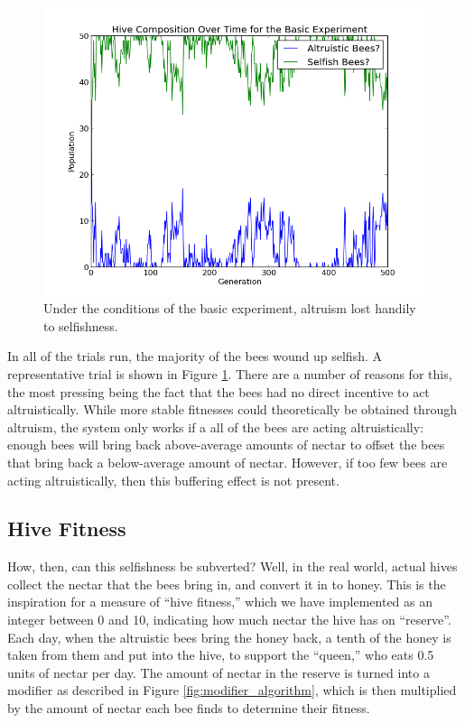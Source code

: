 \documentclass[11pt]{article}
\begin{document}
			\begin{figure}[tbpH!]
				\begin{center}
					\includegraphics[scale=.5]{results/basic_comp.png}
				\end{center}
				\caption{Under the conditions of the basic experiment, altruism lost handily to selfishness.}
				\label{fig:basic_experiment_composition}
			\end{figure}

			In all of the trials run, the majority of the bees wound up selfish. A representative trial is shown in Figure \ref{fig:basic_experiment_composition}. There are a number of reasons for this, the most pressing being the fact that the bees had no direct incentive to act altruistically. While more stable fitnesses could theoretically be obtained through altruism, the system only works if a all of the bees are acting altruistically: enough bees will bring back above-average amounts of nectar to offset the bees that bring back a below-average amount of nectar. However, if too few bees are acting altruistically, then this buffering effect is not present. 



		\subsection{Hive Fitness} %
		\label{sub:hive_fitness}
			How, then, can this selfishness be subverted? Well, in the real world, actual hives collect the nectar that the bees bring in, and convert it in to honey. This is the inspiration for a measure of ``hive fitness,'' which we have implemented as an integer between 0 and 10, indicating how much nectar the hive has on ``reserve''. Each day, when the altruistic bees bring the honey back, a tenth of the honey is taken from them and put into the hive, to support the ``queen,'' who eats 0.5 units of nectar per day. The amount of nectar in the reserve is turned into a modifier as described in Figure \ref{fig:modifier_algorithm}, which is then multiplied by the amount of nectar each bee finds to determine their fitness.
\end{document}
